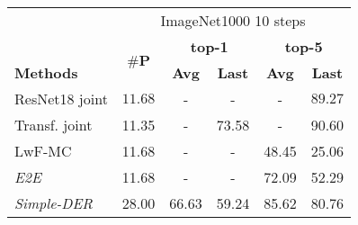 \begin{table*}[t]
    \centering
    \begin{adjustbox}{max width=\textwidth}
        \begin{tabular}{l|ccccc}
            \toprule[0.3mm]
                                                                                   & \multicolumn{5}{c}{ImageNet1000 10 steps}                                                                                                                               \\
                                                                                   & \multirow{2}{*}{\textbf{$\#$P}}           & \multicolumn{2}{c}{\textbf{top-1}} & \multicolumn{2}{c}{\textbf{top-5}}                                                     \\
            \cmidrule{3-6}
            \textbf{Methods}                                                       &                                           & \textbf{Avg}                       & \textbf{Last}                      & \textbf{Avg}            & \textbf{Last}           \\
            \hline
            ResNet18 joint                                                         & $11.68$                                   & -                                  & -                                  & -                       & $89.27$                 \\
            Transf. joint                                                          & 11.35                                     & -                                  & 73.58                              & -                       & 90.60                   \\
            \midrule
            LwF-MC \scriptsize{\citep{rebuffi2017icarl}}                           & 11.68                                     & -                                  & -                                  & 48.45                   & 25.06                   \\
            \textit{E2E} \scriptsize{\citep{castro2018end_to_end_inc_learn}}       & 11.68                                     & -                                  & -                                  & 72.09                   & 52.29                   \\
            \textit{Simple-DER} \scriptsize{\citep{li2021preserve}}                & 28.00                                     & 66.63                              & 59.24                              & 85.62                   & 80.76                   \\

\end{tabular}
\end{adjustbox}
\end{table*}
